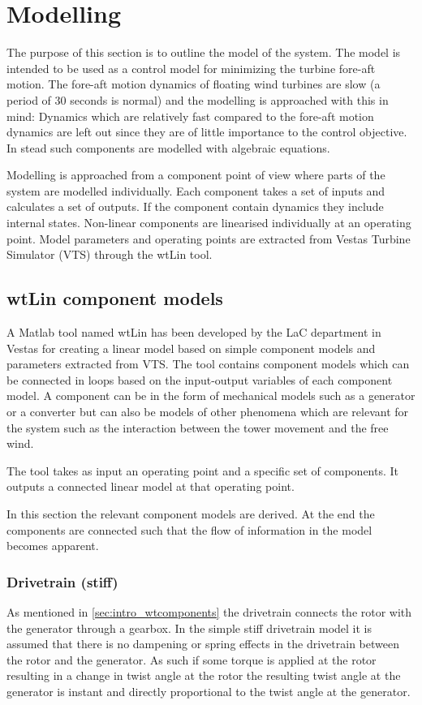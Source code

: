\section{Modelling} \label{sec:mod} %
The purpose of this section is to outline the model of the system. The model is intended to be used as a control model for minimizing the turbine fore-aft motion. The fore-aft motion dynamics of floating wind turbines are slow (a period of 30 seconds is normal) and the modelling is approached with this in mind: Dynamics which are relatively fast compared to the fore-aft motion dynamics are left out since they are of little importance to the control objective. In stead such components are modelled with algebraic equations. 

Modelling is approached from a component point of view where parts of the system are modelled individually. Each component takes a set of inputs and calculates a set of outputs. If the component contain dynamics they include internal states. Non-linear components are linearised individually at an operating point. Model parameters and operating points are extracted from Vestas Turbine Simulator (VTS) through the wtLin tool.


\subsection{wtLin component models} \label{sec:mod_wtLincomps}
A Matlab tool named wtLin has been developed by the LaC department in Vestas for creating a linear model based on simple component models and parameters extracted from VTS. The tool contains component models which can be connected in loops based on the input-output variables of each component model. A component can be in the form of mechanical models such as a generator or a converter but can also be models of other phenomena which are relevant for the system such as the interaction between the tower movement and the free wind.

The tool takes as input an operating point and a specific set of components. It outputs a connected linear model at that operating point.

In this section the relevant component models are derived. At the end the components are connected such that the flow of information in the model becomes apparent. 


\subsubsection{Drivetrain (stiff)}
As mentioned in \cref{sec:intro_wtcomponents} the drivetrain connects the rotor with the generator through a gearbox. In the simple stiff drivetrain model it is assumed that there is no dampening or spring effects in the drivetrain between the rotor and the generator. As such if some torque is applied at the rotor resulting in a change in twist angle at the rotor the resulting twist angle at the generator is instant and directly proportional to the twist angle at the generator.

